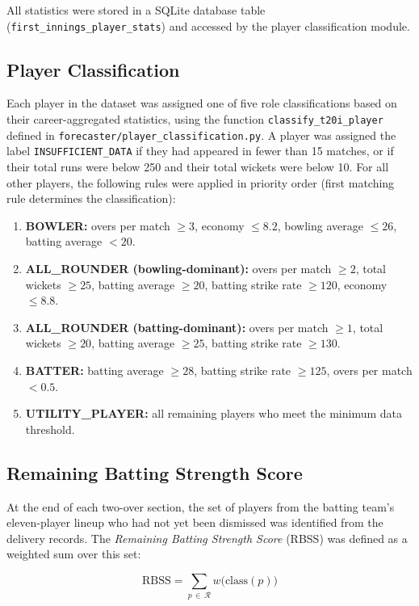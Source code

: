 All statistics were stored in a SQLite database table (\texttt{first\_innings\_player\_stats}) and accessed by the player classification module.

\subsection{Player Classification}

Each player in the dataset was assigned one of five role classifications based on their career-aggregated statistics, using the function \texttt{classify\_t20i\_player} defined in \texttt{forecaster/player\_classification.py}. A player was assigned the label \texttt{INSUFFICIENT\_DATA} if they had appeared in fewer than 15 matches, or if their total runs were below 250 and their total wickets were below 10. For all other players, the following rules were applied in priority order (first matching rule determines the classification):

\begin{enumerate}
    \item \textbf{BOWLER:} overs per match $\geq 3$, economy $\leq 8.2$, bowling average $\leq 26$, batting average $< 20$.
    \item \textbf{ALL\_ROUNDER (bowling-dominant):} overs per match $\geq 2$, total wickets $\geq 25$, batting average $\geq 20$, batting strike rate $\geq 120$, economy $\leq 8.8$.
    \item \textbf{ALL\_ROUNDER (batting-dominant):} overs per match $\geq 1$, total wickets $\geq 20$, batting average $\geq 25$, batting strike rate $\geq 130$.
    \item \textbf{BATTER:} batting average $\geq 28$, batting strike rate $\geq 125$, overs per match $< 0.5$.
    \item \textbf{UTILITY\_PLAYER:} all remaining players who meet the minimum data threshold.
\end{enumerate}

\subsection{Remaining Batting Strength Score}

At the end of each two-over section, the set of players from the batting team's eleven-player lineup who had not yet been dismissed was identified from the delivery records. The \textit{Remaining Batting Strength Score} (RBSS) was defined as a weighted sum over this set:

\begin{equation}
    \text{RBSS} = \sum_{p \,\in\, \mathcal{R}} w\bigl(\text{class}(p)\bigr)
\end{equation}

